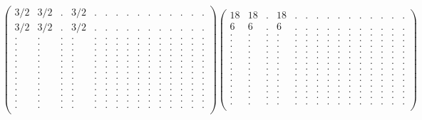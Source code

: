 \documentclass[12pt,a4paper]{amsart}
\begin{document}
\begin{align*}
\left(\begin{array}{rrrrrrrrrrrrrrr}%
3/2&3/2&.&3/2&.&.&.&.&.&.&.&.&.&.&.\\%
3/2&3/2&.&3/2&.&.&.&.&.&.&.&.&.&.&.\\%
.&.&.&.&.&.&.&.&.&.&.&.&.&.&.\\%
.&.&.&.&.&.&.&.&.&.&.&.&.&.&.\\%
.&.&.&.&.&.&.&.&.&.&.&.&.&.&.\\%
.&.&.&.&.&.&.&.&.&.&.&.&.&.&.\\%
.&.&.&.&.&.&.&.&.&.&.&.&.&.&.\\%
.&.&.&.&.&.&.&.&.&.&.&.&.&.&.\\%
.&.&.&.&.&.&.&.&.&.&.&.&.&.&.\\%
.&.&.&.&.&.&.&.&.&.&.&.&.&.&.\\%
.&.&.&.&.&.&.&.&.&.&.&.&.&.&.\\%
.&.&.&.&.&.&.&.&.&.&.&.&.&.&.\\%
.&.&.&.&.&.&.&.&.&.&.&.&.&.&.\\%
.&.&.&.&.&.&.&.&.&.&.&.&.&.&.\\%
.&.&.&.&.&.&.&.&.&.&.&.&.&.&.\\%
\end{array}\right)%
\left(\begin{array}{rrrrrrrrrrrrrrr}%
18&18&.&18&.&.&.&.&.&.&.&.&.&.&.\\%
6&6&.&6&.&.&.&.&.&.&.&.&.&.&.\\%
.&.&.&.&.&.&.&.&.&.&.&.&.&.&.\\%
.&.&.&.&.&.&.&.&.&.&.&.&.&.&.\\%
.&.&.&.&.&.&.&.&.&.&.&.&.&.&.\\%
.&.&.&.&.&.&.&.&.&.&.&.&.&.&.\\%
.&.&.&.&.&.&.&.&.&.&.&.&.&.&.\\%
.&.&.&.&.&.&.&.&.&.&.&.&.&.&.\\%
.&.&.&.&.&.&.&.&.&.&.&.&.&.&.\\%
.&.&.&.&.&.&.&.&.&.&.&.&.&.&.\\%
.&.&.&.&.&.&.&.&.&.&.&.&.&.&.\\%
.&.&.&.&.&.&.&.&.&.&.&.&.&.&.\\%
.&.&.&.&.&.&.&.&.&.&.&.&.&.&.\\%
.&.&.&.&.&.&.&.&.&.&.&.&.&.&.\\%
.&.&.&.&.&.&.&.&.&.&.&.&.&.&.\\%
\end{array}\right)%
\end{align*}
\end{document}
